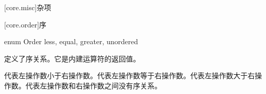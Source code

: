 
[core.misc]{杂项}

[core.order]{序}

\begin{codeblock}
enum Order {
    less,
    equal,
    greater,
    unordered
}
\end{codeblock}

\pnum
{}定义了序关系。它是内建运算符的返回值。

\pnum
{}代表左操作数小于右操作数。代表左操作数等于右操作数。代表左操作数大于右操作数。代表左操作数和右操作数之间没有序关系。